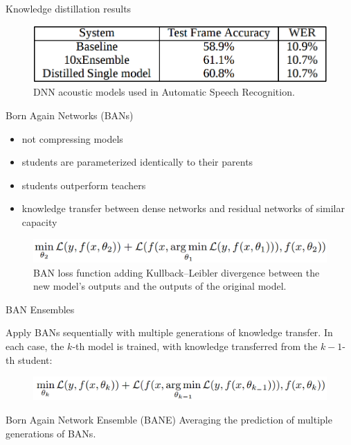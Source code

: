 \documentclass{beamer}
\begin{document}
\begin{frame}{Knowledge distillation results}

\begin{figure}[h]
\includegraphics[width=\textwidth]{img/distilled_result}
\caption{DNN acoustic models used in Automatic Speech Recognition. \cite{cit:distill}}
\end{figure}

\end{frame}
\begin{frame}{Born Again Networks (BANs)}

\begin{itemize}
\item not compressing models
\item students are parameterized identically to their parents
\item students outperform teachers
\item knowledge transfer between dense networks and residual
networks of similar capacity
\end{itemize}

\vfill

\begin{figure}[h]
\includegraphics[width=\textwidth]{img/BAN_loss_func}
\caption{BAN loss function adding Kullback–Leibler divergence between the new model’s outputs and the outputs of the original model. \cite{cit:ban}}
\end{figure}

\end{frame}
\begin{frame}{BAN Ensembles}

Apply BANs sequentially with multiple generations of knowledge transfer. In
each case, the $k$-th model is trained, with knowledge transferred from the $k-1$-th student:

\begin{figure}[h]
\includegraphics[width=\textwidth]{img/sequential_ban1}
\end{figure}

\begin{block}{Born Again Network Ensemble (BANE)}
Averaging the prediction of multiple generations of BANs.
\end{block}
 

\end{frame}
\end{document}
